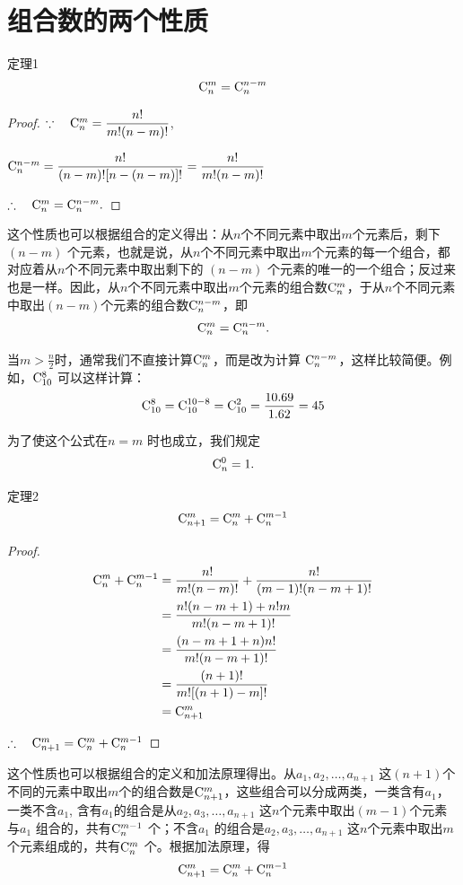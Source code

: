 
\section{组合数的两个性质}
\begin{thm}{定理1}
\[\comb{n}{m}=\comb{n}{n-m}\]
\end{thm}

\begin{proof}
$\because\quad \comb{n}{m}=\frac{n!}{m!(n-m)!}$,

$\comb{n}{n-m}=\frac{n!}{(n-m)![n-(n-m)]!}=\frac{n!}{m!(n-m)!}$

$\therefore\quad \comb{n}{m}=\comb{n}{n-m}.$
\end{proof}



这个性质也可以根据组合的定义得出：从$n$个不同元素中取出$m$个元素后，剩下 $(n-m)$ 个元素，也就是说，从$n$个不同元素中取出$m$个元素的每一个组合，都对应着从$n$个不同元素中取出剩下的 $(n-m)$ 个元素的唯一的一个组合；反过来也是一样。因此，从$n$个不同元素中取出$m$个元素的组合数$\comb{n}{m}$，于从$n$个不同元素中取出$( n-m )$个元素的组合数$\comb{n}{n-m}$，即
\[\comb{n}{m}=\comb{n}{n-m}.\]

当$m>\frac{n}{2}$时，通常我们不直接计算$\comb{n}{m}$，而是改为计算
$\comb{n}{n-m}$，这样比较简便。例如，$\comb{10}{8}$ 可以这样计算：
\[\comb{10}{8}=\comb{10}{10-8}=\comb{10}{2}=\frac{10\x 9}{1\x 2}=45\]

\begin{remark}
    为了使这个公式在$n=m$ 时也成立，我们规定
\[\comb{n}{0}=1.\]
\end{remark}

\begin{thm}{定理2}
\[
\comb{n+1}{m}=\comb{n}{m}+\comb{n}{m-1}
 \]   
\end{thm}

\begin{proof}
\[\begin{split}
    \comb{n}{m}+\comb{n}{m-1}&=\frac{n!}{m!(n-m)!}+\frac{n!}{(m-1)!(n-m+1)!}\\
&=\frac{n!(n-m+1)+n!m}{m!(n-m+1)!}\\
&=\frac{(n-m+1+n)n!}{m!(n-m+1)!}\\
&=\frac{(n+1)!}{m![(n+1)-m]!}\\
&=\comb{n+1}{m}
\end{split}\]

$\therefore\quad \comb{n+1}{m}=\comb{n}{m}+\comb{n}{m-1}$
\end{proof}


这个性质也可以根据组合的定义和加法原理得出。从$a_{1},a_{2},\ldots,a_{n+1}$ 这$( n+1 )$个不同的元素中取出$m$个的组合数是$\comb{n+1}{m}$，这些组合可以分成两类，一类含有$a_{1}$，一类不含$a_{1}$, 含有$a_{1}$的组合是从$a_{2},a_{3},\ldots,a_{n+1}$ 这$n$个元素中取出$( m-1 )$个元素与$a_{1}$ 组合的，共有$\comb{n}{m-1}$ 个；不含$a_{1}$ 的组合是$a_{2},a_{3},\ldots,  a_{n+1}$ 这$n$个元素中取出$m$个元素组成的，共有$\comb{n}{m}$ 个。根据加法原理，得
\[\comb{n+1}{m}=\comb{n}{m}+\comb{n}{m-1}\]

